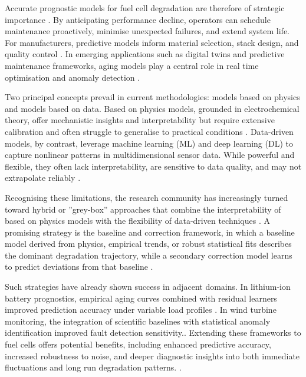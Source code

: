 Accurate prognostic models for fuel cell degradation are therefore of strategic importance \cite{Humphreys2020Prognostics,Willard2022NRP,Karpatne2019TGDS}. By anticipating performance decline, operators can schedule maintenance proactively, minimise unexpected failures, and extend system life. For manufacturers, predictive models inform material selection, stack design, and quality control \cite{Zhang2019BoostingPEM,Severson2019BatteryPrognostics}. In emerging applications such as digital twins and predictive maintenance frameworks, aging models play a central role in real time optimisation and anomaly detection \cite{Willard2022NRP,Rasouli2022DigitalTwin}.

Two principal concepts prevail in current methodologies: models based on physics and models based on data. Based on physics  models, grounded in electrochemical theory, offer mechanistic insights and interpretability but require extensive calibration and often struggle to generalise to practical conditions \cite{Eikerling2014Degradation,Borup2007CR,Song2019Review}. Data-driven models, by contrast, leverage machine learning (ML) and deep learning (DL) to capture nonlinear patterns in multidimensional sensor data. While powerful and flexible, they often lack interpretability, are sensitive to data quality, and may not extrapolate reliably \cite{Willard2022NRP,Karpatne2019TGDS,Goodfellow2016DL}.

Recognising these limitations, the research community has increasingly turned toward hybrid or ''grey-box'' approaches that combine the interpretability of based on physics models with the flexibility of data-driven techniques \cite{Karpatne2019TGDS,Willard2022NRP,Raissi2019PINN}. A promising strategy is the baseline and correction framework, in which a baseline model derived from physics, empirical trends, or robust statistical fits describes the dominant degradation trajectory, while a secondary correction model learns to predict deviations from that baseline \cite{Raissi2019PINN,Willard2022NRP,Severson2019BatteryPrognostics}.  

Such strategies have already shown success in adjacent domains. In lithium-ion battery prognostics, empirical aging curves combined with residual learners improved prediction accuracy under variable load profiles \cite{Severson2019BatteryPrognostics,Attia2020BatteryScience}. In wind turbine monitoring, the integration of scientific baselines with statistical anomaly identification improved fault detection sensitivity.\cite{Zhang2021WindHybrid,Jiang2022WindTurbinePHM}. Extending these frameworks to fuel cells offers potential benefits, including enhanced predictive accuracy, increased robustness to noise, and deeper diagnostic insights into both immediate fluctuations and long run degradation patterns. \cite{Zhang2019BoostingPEM,Humphreys2020Prognostics}.

